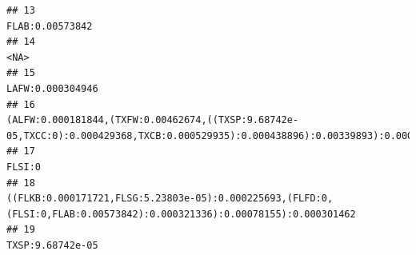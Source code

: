 \documentclass[]{article}
\begin{document}
\begin{verbatim}
## 13                                                                                                                                                                                                                                                                                                                                                                                                   FLAB:0.00573842
## 14                                                                                                                                                                                                                                                                                                                                                                                                              <NA>
## 15                                                                                                                                                                                                                                                                                                                                                                                                  LAFW:0.000304946
## 16                                                                                                                                                                                                                                                                                  (ALFW:0.000181844,(TXFW:0.00462674,((TXSP:9.68742e-05,TXCC:0):0.000429368,TXCB:0.000529935):0.000438896):0.00339893):0.000450879
## 17                                                                                                                                                                                                                                                                                                                                                                                                            FLSI:0
## 18                                                                                                                                                                                                                                                                                            ((FLKB:0.000171721,FLSG:5.23803e-05):0.000225693,(FLFD:0,(FLSI:0,FLAB:0.00573842):0.000321336):0.00078155):0.000301462
## 19                                                                                                                                                                                                                                                                                                                                                                                                  TXSP:9.68742e-05

\end{verbatim}
\end{document}
